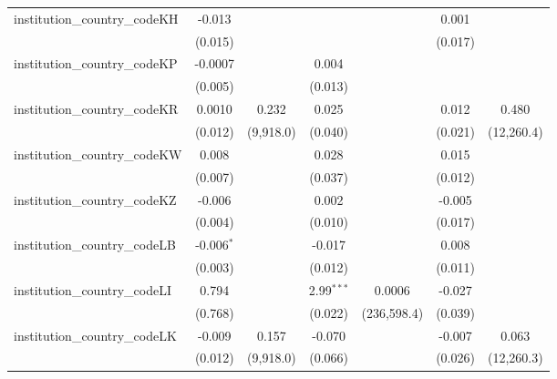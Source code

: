 \begin{tabular}{lcccccc}
   institution\_country\_codeKH          & -0.013         &               &               &              & 0.001        &   \\   
                                         & (0.015)        &               &               &              & (0.017)      &   \\   
   institution\_country\_codeKP          & -0.0007        &               & 0.004         &              &              &   \\   
                                         & (0.005)        &               & (0.013)       &              &              &   \\   
   institution\_country\_codeKR          & 0.0010         & 0.232         & 0.025         &              & 0.012        & 0.480\\   
                                         & (0.012)        & (9,918.0)     & (0.040)       &              & (0.021)      & (12,260.4)\\   
   institution\_country\_codeKW          & 0.008          &               & 0.028         &              & 0.015        &   \\   
                                         & (0.007)        &               & (0.037)       &              & (0.012)      &   \\   
   institution\_country\_codeKZ          & -0.006         &               & 0.002         &              & -0.005       &   \\   
                                         & (0.004)        &               & (0.010)       &              & (0.017)      &   \\   
   institution\_country\_codeLB          & -0.006$^{*}$   &               & -0.017        &              & 0.008        &   \\   
                                         & (0.003)        &               & (0.012)       &              & (0.011)      &   \\   
   institution\_country\_codeLI          & 0.794          &               & 2.99$^{***}$  & 0.0006       & -0.027       &   \\   
                                         & (0.768)        &               & (0.022)       & (236,598.4)  & (0.039)      &   \\   
   institution\_country\_codeLK          & -0.009         & 0.157         & -0.070        &              & -0.007       & 0.063\\   
                                         & (0.012)        & (9,918.0)     & (0.066)       &              & (0.026)      & (12,260.3)\\   

\end{tabular}
